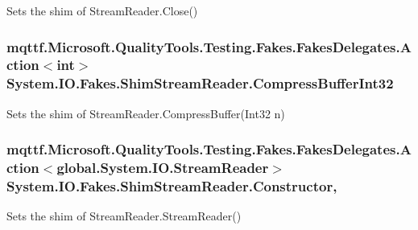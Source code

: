 Sets the shim of Stream\-Reader.\-Close()

\hypertarget{class_system_1_1_i_o_1_1_fakes_1_1_shim_stream_reader_a5440fd7fe5681738e7dca2d3ba504773}{
\subsubsection[{Compress\-Buffer\-Int32}]{\setlength{\rightskip}{0pt plus 5cm}mqttf.\-Microsoft.\-Quality\-Tools.\-Testing.\-Fakes.\-Fakes\-Delegates.\-Action$<$int$>$ System.\-I\-O.\-Fakes.\-Shim\-Stream\-Reader.\-Compress\-Buffer\-Int32\hspace{0.3cm}{\ttfamily [set]}}}\label{class_system_1_1_i_o_1_1_fakes_1_1_shim_stream_reader_a5440fd7fe5681738e7dca2d3ba504773}


Sets the shim of Stream\-Reader.\-Compress\-Buffer(\-Int32 n)

\hypertarget{class_system_1_1_i_o_1_1_fakes_1_1_shim_stream_reader_a1fc96898402f133c74b14ff9b3f0d910}{
\subsubsection[{Constructor}]{\setlength{\rightskip}{0pt plus 5cm}mqttf.\-Microsoft.\-Quality\-Tools.\-Testing.\-Fakes.\-Fakes\-Delegates.\-Action$<$global.\-System.\-I\-O.\-Stream\-Reader$>$ System.\-I\-O.\-Fakes.\-Shim\-Stream\-Reader.\-Constructor\hspace{0.3cm}{\ttfamily [static]}, {\ttfamily [set]}}}\label{class_system_1_1_i_o_1_1_fakes_1_1_shim_stream_reader_a1fc96898402f133c74b14ff9b3f0d910}


Sets the shim of Stream\-Reader.\-Stream\-Reader()

